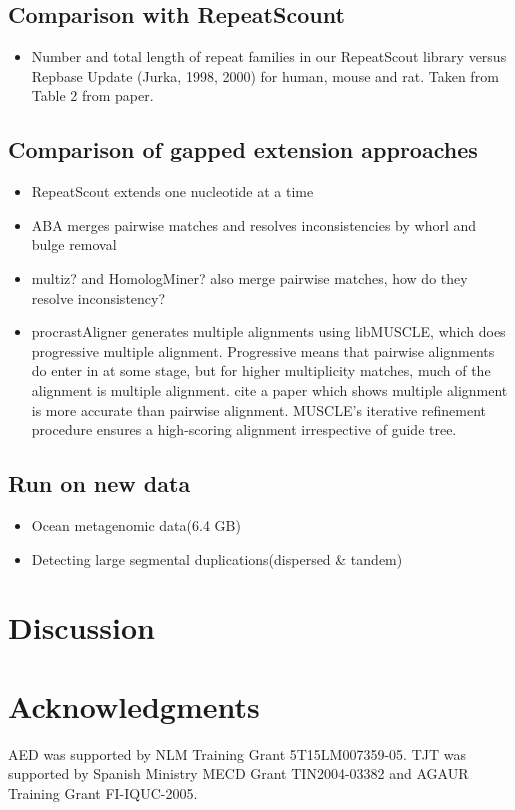 \documentclass{llncs}
\begin{document}
 \subsection{Comparison with RepeatScount}
\begin{itemize}
\item Number and total length of repeat families in our RepeatScout
library versus Repbase Update (Jurka, 1998, 2000) for human, mouse
and rat. Taken from Table 2 from paper.
\end{itemize}

\subsection{Comparison of gapped
extension approaches}
\begin{itemize}

\item RepeatScout extends one nucleotide at a time
\item ABA merges pairwise matches and resolves inconsistencies by
whorl and bulge removal
\item multiz? and HomologMiner? also merge pairwise matches, how do
they resolve inconsistency?
\item procrastAligner generates multiple alignments using libMUSCLE,
which does progressive multiple alignment.  Progressive means that
pairwise alignments do enter in at some stage, but for higher
multiplicity matches, much of the alignment is multiple alignment.
cite a paper which shows multiple alignment is more accurate than
pairwise alignment.  MUSCLE's iterative refinement procedure ensures
a high-scoring alignment irrespective of guide tree.

\end{itemize}

\subsection{Run on new data}
 \begin{itemize}
 \item Ocean metagenomic data(6.4 GB)
 \item Detecting large segmental duplications(dispersed \& tandem)
\end{itemize}

\section{Discussion}

\section{ Acknowledgments }
AED was supported by NLM Training Grant 5T15LM007359-05. TJT was
supported by Spanish Ministry MECD Grant TIN2004-03382 and AGAUR
Training Grant FI-IQUC-2005.


\small

\end{document}
